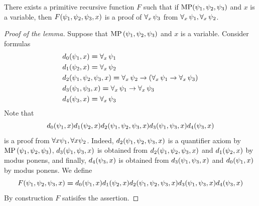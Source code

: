\documentclass[10pt]{amsart}
\newcommand{\meq}{\boldsymbol{=}}
\begin{document}
\begin{lemma}\label{lemma:modus_ponens_case_of_variable_generalization}
  There exists a primitive recursive function $F$ such that if $\mathrm{MP}(\psi_{\rm{1}},\psi_{\rm{2}},\psi_{\rm{3}})$ and $x$ is a variable, then $F(\psi_{\rm{1}},\psi_{\rm{2}},\psi_{\rm{3}},x)$ is a proof of $\forall_x\,\psi_{\rm{3}}$ from $\forall_x\,\psi_{\rm{1}},\forall_x\,\psi_{\rm{2}}$. 
\end{lemma}
\begin{proof}[Proof of the lemma]
Suppose that $\mathrm{MP}\left(\psi_{\rm{1}},\psi_{\rm{2}},\psi_{\rm{3}}\right)$ and $x$ is a variable. Consider formulas
  \begin{align*}
    &d_{\rm{0}}(\psi_{\rm{1}},x) \meq \forall_x\,\psi_{\rm{1}}\\
    &d_{\rm{1}}(\psi_{\rm{2}},x) \meq \forall_x\,\psi_{\rm{2}}\\
    &d_{\rm{2}}(\psi_{\rm{1}},\psi_{\rm{2}},\psi_{\rm{3}},x) \meq \forall_x\,\psi_{\rm{2}}\ra \left(\forall_x\,\psi_{\rm{1}} \ra \forall_x\,\psi_{\rm{3}}\right)\\
    &d_{\rm{3}}(\psi_{\rm{1}},\psi_{\rm{3}},x) \meq \forall_x\,\psi_{\rm{1}} \ra \forall_x\,\psi_{\rm{3}}\\
    &d_{\rm{4}}(\psi_{\rm{3}},x) \meq \forall_x\,\psi_{\rm{3}} \\
  \end{align*}
  Note that 
  $$d_{\rm{0}}(\psi_{\rm{1}},x)d_{\rm{1}}(\psi_{\rm{2}},x)d_{\rm{2}}(\psi_{\rm{1}},\psi_{\rm{2}},\psi_{\rm{3}},x)d_{\rm{3}}(\psi_{\rm{1}},\psi_{\rm{3}},x)d_{\rm{4}}(\psi_{\rm{3}},x)$$
  is a proof from $\forall x \psi_{\rm{1}},\forall x \psi_{\rm{2}}$. Indeed, $d_{\rm{2}}(\psi_{\rm{1}},\psi_{\rm{2}},\psi_{\rm{3}},x)$ is a quantifier axiom by $\mathrm{MP}\left(\psi_{\rm{1}},\psi_{\rm{2}},\psi_{\rm{3}}\right)$, $d_{\rm{3}}(\psi_{\rm{1}},\psi_{\rm{3}},x)$ is obtained from $d_{\rm{2}}(\psi_{\rm{1}},\psi_{\rm{2}},\psi_{\rm{3}},x)$ and $d_{\rm{1}}(\psi_{\rm{2}},x)$ by modus ponens, and finally, $d_{\rm{4}}(\psi_{\rm{3}},x)$ is obtained from $d_{\rm{3}}(\psi_{\rm{1}},\psi_{\rm{3}},x)$ and $d_{\rm{0}}(\psi_{\rm{1}},x)$ by modus ponens. We define
  $$F(\psi_{\rm{1}},\psi_{\rm{2}},\psi_{\rm{3}},x) \meq d_{\rm{0}}(\psi_{\rm{1}},x)d_{\rm{1}}(\psi_{\rm{2}},x)d_{\rm{2}}(\psi_{\rm{1}},\psi_{\rm{2}},\psi_{\rm{3}},x)d_{\rm{3}}(\psi_{\rm{1}},\psi_{\rm{3}},x)d_{\rm{4}}(\psi_{\rm{3}},x)$$
  By construction $F$ satisifes the assertion.
\end{proof}
\end{document}
